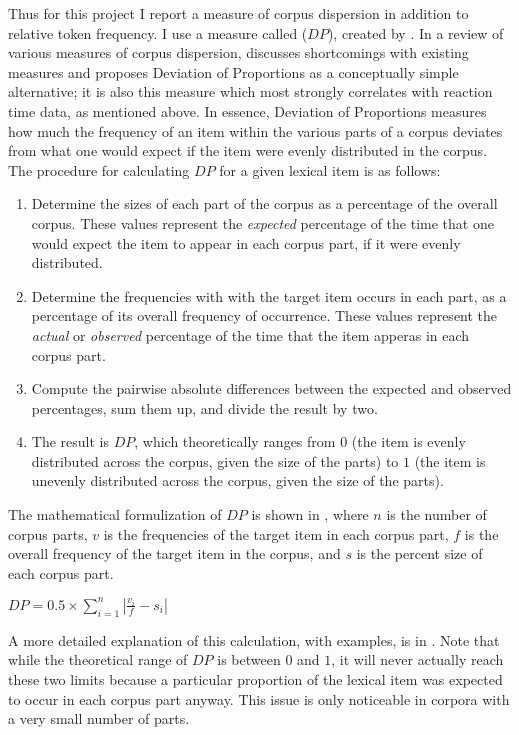 Thus for this project I report a measure of corpus dispersion in addition to relative token frequency. I use a measure called  ($DP$), created by \textcite{Gries2008}. In a review of various measures of corpus dispersion, \textcite{Gries2008} discusses shortcomings with existing measures and proposes Deviation of Proportions as a conceptually simple alternative; it is also this measure which most strongly correlates with reaction time data, as mentioned above. In essence, Deviation of Proportions measures how much the frequency of an item within the various parts of a corpus deviates from what one would expect if the item were evenly distributed in the corpus. The procedure for calculating $DP$ for a given lexical item is as follows:

\begin{enumerate}
  \item Determine the sizes of each part of the corpus as a percentage of the overall corpus. These values represent the \emph{expected} percentage of the time that one would expect the item to appear in each corpus part, if it were evenly distributed.
  \item Determine the frequencies with with the target item occurs in each part, as a percentage of its overall frequency of occurrence. These values represent the \emph{actual} or \emph{observed} percentage of the time that the item apperas in each corpus part.
  \item Compute the pairwise absolute differences between the expected and observed percentages, sum them up, and divide the result by two.
  \item The result is $DP$, which theoretically ranges from $0$ (the item is evenly distributed across the corpus, given the size of the parts) to $1$ (the item is unevenly distributed across the corpus, given the size of the parts).
\end{enumerate}

\noindent The mathematical formulization of $DP$ is shown in , where $n$ is the number of corpus parts, $v$ is the frequencies of the target item in each corpus part, $f$ is the overall frequency of the target item in the corpus, and $s$ is the percent size of each corpus part.

\begin{exe}
  \ex\label{ex:DP}
  $DP = 0.5 \times \displaystyle\sum_{i = 1}^{n}|\frac{v_i}{f} - s_i|$
\end{exe}

\noindent A more detailed explanation of this calculation, with examples, is in \textcite[§3]{Gries2008}. Note that while the theoretical range of $DP$ is between $0$ and $1$, it will never actually reach these two limits because a particular proportion of the lexical item was expected to occur in each corpus part anyway. This issue is only noticeable in corpora with a very small number of parts.


